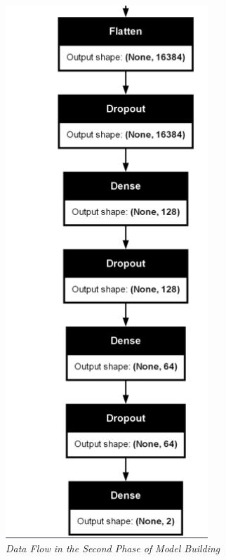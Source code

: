 \begin{figure}[htbp]
    \centering
    \includegraphics[width=3in]{img/2NDPHASE.png}
    \caption{\textit{Data Flow in the Second Phase of Model Building}}
\end{figure}
 

\newpage